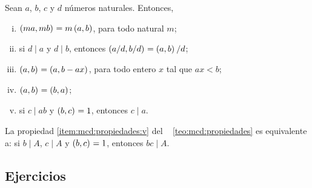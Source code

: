 \begin{teoDivisibilidad}%
	\label{teo:mcd:propiedades}
	Sean $a$, $b$, $c$ y $d$ n\'umeros naturales. Entonces,
	\begin{enumerate}[(i)]
		\item\label{item:mcd:propiedades:i}
			$\left({ma,mb}\right)_{}=m\left({a,b}\right)_{}$, para todo natural $m$;
		\item\label{item:mcd:propiedades:ii}
			si $d\mid a$ y $d\mid b$, entonces
			$\left({a/d,b/d}\right)_{}=\left({a,b}\right)_{}/d$;
		\item\label{item:mcd:propiedades:iii}
			$\left({a,b}\right)_{}=\left({a,b-ax}\right)_{}$, para todo entero $x$ tal
			que $ax<b$;
		\item\label{item:mcd:propiedades:iv}
			$\left({a,b}\right)_{}=\left({b,a}\right)_{}$;
		\item\label{item:mcd:propiedades:v}
			si $c\mid ab$ y $\left({b,c}\right)_{}=1$, entonces $c\mid a$.
	\end{enumerate}
\end{teoDivisibilidad}

\begin{obsDivisibilidad}\label{obs:divisibilidad:propiedades:mcd}
	La propiedad \eqref{item:mcd:propiedades:v} del \teoname~%
	\ref{teo:mcd:propiedades} es equivalente a:
	si $b\mid A$, $c\mid A$ y $\left({b,c}\right)_{}=1$, entonces $bc\mid A$.
\end{obsDivisibilidad}

\subsection*{Ejercicios}


